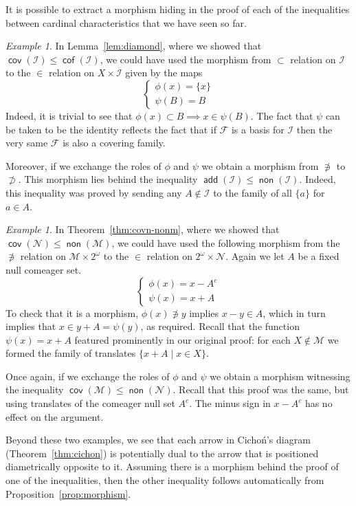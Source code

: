\documentclass[11pt,oneside,a4paper]{amsbook}
\newcommand{\Null}{\mathcal N}
\newcommand{\Meager}{\mathcal M}
\DeclareMathOperator{\add}{\mathsf{add}}
\DeclareMathOperator{\non}{\mathsf{non}}
\DeclareMathOperator{\cov}{\mathsf{cov}}
\DeclareMathOperator{\cof}{\mathsf{cof}}
\theoremstyle{definition}
\theoremstyle{plain}
\theoremstyle{definition}
\theoremstyle{remark}
\newtheorem{example}[theorem]{Example}
\numberwithin{equation}{section}
\numberwithin{figure}{section}
\begin{document}
It is possible to extract a morphism hiding in the proof of each of the inequalities between cardinal characteristics that we have seen so far.

\begin{example}
  In Lemma~\ref{lem:diamond}, where we showed that $\cov(\mathcal I)\leq\cof(\mathcal I)$, we could have used the morphism from $\subset$ relation on $\mathcal I$ to the $\in$ relation on $X\times\mathcal I$ given by the maps
  \[\begin{cases}\phi(x)=\{x\}\\\psi(B)=B\end{cases}
  \]
  Indeed, it is trivial to see that $\phi(x)\subset B\implies x\in\psi(B)$. The fact that $\psi$ can be taken to be the identity reflects the fact that if $\mathcal F$ is a basis for $\mathcal I$ then the very same $\mathcal F$ is also a covering family.

  Moreover, if we exchange the roles of $\phi$ and $\psi$ we obtain a morphism from $\not\ni$ to $\not\supset$. This morphism lies behind the inequality $\add(\mathcal I)\leq\non(\mathcal I)$. Indeed, this inequality was proved by sending any $A\notin\mathcal I$ to the family of all $\{a\}$ for $a\in A$.
\end{example}

\begin{example}
  In Theorem~\ref{thm:covn-nonm}, where we showed that $\cov(\Null)\leq\non(\Meager)$, we could have used the following morphism from the $\not\ni$ relation on $\Meager\times2^\omega$ to the $\in$ relation on $2^\omega\times\Null$. Again we let $A$ be a fixed null comeager set.
  \[\begin{cases}\phi(x)=x-A^c\\\psi(x)=x+A\end{cases}
  \]
  To check that it is a morphism, $\phi(x)\not\ni y$ implies $x-y\in A$, which in turn implies that $x\in y+A=\psi(y)$, as required. Recall that the function $\psi(x)=x+A$ featured prominently in our original proof: for each $X\notin\Meager$ we formed the family of translates $\{x+A\mid x\in X\}$.

  Once again, if we exchange the roles of $\phi$ and $\psi$ we obtain a morphism witnessing the inequality $\cov(\Meager)\leq\non(\Null)$. Recall that this proof was the same, but using translates of the comeager null set $A^c$. The minus sign in $x-A^c$ has no effect on the argument.
\end{example}

Beyond these two examples, we see that each arrow in Cicho\'n's diagram (Theorem~\ref{thm:cichon}) is potentially dual to the arrow that is positioned diametrically opposite to it. Assuming there is a morphism behind the proof of one of the inequalities, then the other inequality follows automatically from Proposition~\ref{prop:morphism}.
\end{document}
